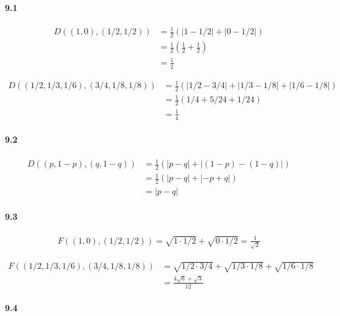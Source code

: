 

\paragraph{9.1}
\begin{align*}
	D((1,0), (1/2,1/2)) &= \frac{1}{2} \left( |1 - 1/2| + |0 - 1/2| \right)\\
		&= \frac{1}{2} \left(\frac{1}{2} +  \frac{1}{2} \right)\\
		&= \frac{1}{2}
\end{align*}

\begin{align*}
	D\left( (1/2,1/3,1/6), (3/4, 1/8, 1/8)  \right) &= \frac{1}{2} \left( |1/2 - 3/4| + |1/3 - 1/8| + |1/6 - 1/8| \right)\\
		&= \frac{1}{2} \left( 1/4 + 5 / 24 + 1/24 \right)\\
		&= \frac{1}{4}
\end{align*}



\paragraph{9.2}
\begin{align*}
	D\left((p,1-p), (q, 1-q)\right) &= \frac{1}{2} \left( |p-q| + |(1-p) - (1-q)| \right)\\
		&= \frac{1}{2} \left( |p-q| + |-p + q| \right)\\
		&= |p-q|
\end{align*}


\paragraph{9.3}
\begin{align*}
	F((1,0), (1/2,1/2)) = \sqrt{1 \cdot 1/2} + \sqrt{0 \cdot 1/2} = \frac{1}{\sqrt{2}}
\end{align*}

\begin{align*}
	F\left( (1/2,1/3,1/6), (3/4, 1/8, 1/8)  \right) &= \sqrt{1/2 \cdot 3/4} + \sqrt{1/3 \cdot 1/8} + \sqrt{1/6 \cdot 1/8}\\
		&= \frac{4 \sqrt{6} + \sqrt{3}}{12}
\end{align*}



\paragraph{9.4}

